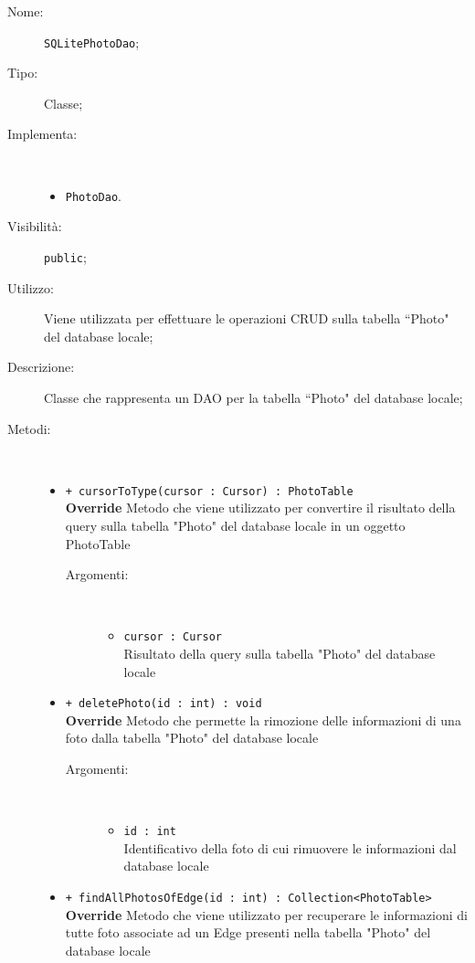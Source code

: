 \documentclass[../DefinizioneDiProdotto.tex]{subfiles}
\begin{document}
    \begin{description}
\item[Nome:] \texttt{SQLitePhotoDao};
\item[Tipo:] Classe;
\item[Implementa:] \
\begin{itemize}
\item \texttt{PhotoDao}.

\end{itemize}
\item[Visibilità:] \texttt{public};
\item[Utilizzo:] Viene utilizzata per effettuare le operazioni CRUD sulla tabella “Photo" del database locale;
\item[Descrizione:] Classe che rappresenta un DAO per la tabella “Photo" del database locale;
\item[Metodi:] \
\begin{itemize}
\item \texttt{+ cursorToType(cursor : Cursor) : PhotoTable}\\
\textbf{Override} Metodo che viene utilizzato per convertire il risultato della query sulla tabella "Photo" del database locale in un oggetto PhotoTable
 \begin{description}
\item[Argomenti:] \
\begin{itemize}
\item \texttt{cursor : Cursor}\\
Risultato della query sulla tabella "Photo" del database locale\end{itemize}
\end{description}
\item \texttt{+ deletePhoto(id : int) : void}\\
\textbf{Override} Metodo che permette la rimozione delle informazioni di una foto dalla tabella "Photo" del database locale
 \begin{description}
\item[Argomenti:] \
\begin{itemize}
\item \texttt{id : int}\\
Identificativo della foto di cui rimuovere le informazioni dal database locale\end{itemize}
\end{description}
\item \texttt{+ findAllPhotosOfEdge(id : int) : Collection<PhotoTable>}\\
\textbf{Override} Metodo che viene utilizzato per recuperare le informazioni di tutte foto associate ad un Edge presenti nella tabella "Photo" del database locale

\end{itemize}
\end{description}
\end{document}
